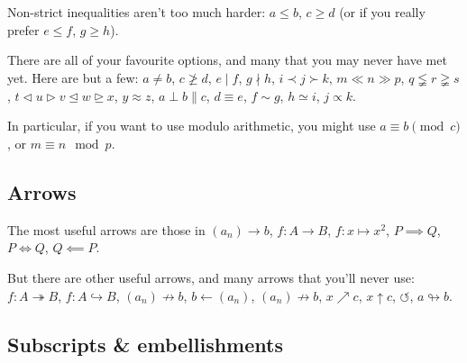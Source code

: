 \documentclass[a4paper,11pt]{article}
\begin{document}
Non-strict inequalities aren't too much harder: 
$a\leq b$, 		%
$c \geq d$ 		%
(or if you really prefer 
$e\leqslant f$, %
$g\geqslant h$).%

There are all of your favourite options, and many that you may never have met yet. Here are but a few: 
$a \neq b$, 		%
$c \ngeq d$, 		%
$e \mid f$, 		%
$g \nmid h$, 		%
$i \prec j \succ k$, %
$m \ll n \gg p$, 	%
$q \lneqq r \gneqq s$, %
$t \lhd u \rhd v \unlhd w \unrhd x $,  %
$y \approx z$,  	%
$a \perp b \parallel c$, %
$d \equiv e$, 		%
$f \sim g $,  		%
$h \simeq i$, 		%
$j \propto k $. 	%

In particular, if you want to use modulo arithmetic, you might use $a \equiv b \pmod c$, or $m \equiv n \mod p$.

\subsection{Arrows}

The most useful arrows are those in 
$(a_n) \to b$, 		%
$f:A \to B$, 		%
$f: x \mapsto x^2$, %
$P \implies Q$, 	%
$P \iff Q$, 		%
$Q \impliedby  P$. 	%


But there are other useful arrows, and many arrows that you'll never use:
$f:A \twoheadrightarrow B$, %
$f:A \hookrightarrow B$, 	%
$(a_n) \not \to b$, 		%
$b \gets (a_n)$, 			%
$(a_n) \nrightarrow b$, 	%
$ x \nearrow c$,			%
$ x \uparrow c$, 			%
$ \circlearrowleft$, 		%
$ a \looparrowright b $. 	%


\subsection{Subscripts \& embellishments}
\end{document}

